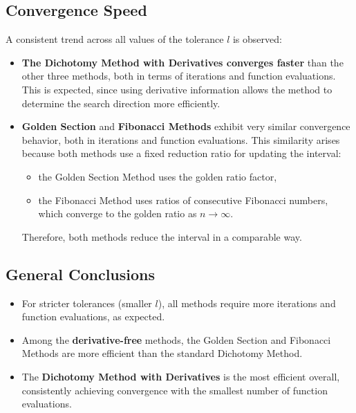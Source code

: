 \documentclass[11pt]{article}
\begin{document}
\subsection{Convergence Speed}

A consistent trend across all values of the tolerance $l$ is observed:

\begin{itemize}
    \item \textbf{The Dichotomy Method with Derivatives converges faster} than the other three methods, both in terms of iterations and function evaluations.  
    This is expected, since using derivative information allows the method to determine the search direction more efficiently.

    \item \textbf{Golden Section} and \textbf{Fibonacci Methods} exhibit very similar convergence behavior, both in iterations and function evaluations.  
    This similarity arises because both methods use a fixed reduction ratio for updating the interval:
    \begin{itemize}
        \item the Golden Section Method uses the golden ratio factor,
        \item the Fibonacci Method uses ratios of consecutive Fibonacci numbers, which converge to the golden ratio as $n \to \infty$.
    \end{itemize}
    Therefore, both methods reduce the interval in a comparable way.
\end{itemize}

\subsection{General Conclusions}

\begin{itemize}
    \item For stricter tolerances (smaller $l$), all methods require more iterations and function evaluations, as expected.

    \item Among the \textbf{derivative-free} methods, the Golden Section and Fibonacci Methods are more efficient than the standard Dichotomy Method.

    \item The \textbf{Dichotomy Method with Derivatives} is the most efficient overall, consistently achieving convergence with the smallest number of function evaluations.
\end{itemize}
\end{document}
